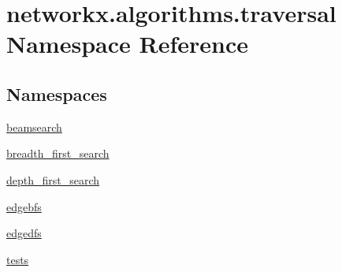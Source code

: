 \hypertarget{namespacenetworkx_1_1algorithms_1_1traversal}{}\section{networkx.\+algorithms.\+traversal Namespace Reference}
\label{namespacenetworkx_1_1algorithms_1_1traversal}
\subsection*{Namespaces}
\begin{DoxyCompactItemize}
\item 
 \hyperlink{namespacenetworkx_1_1algorithms_1_1traversal_1_1beamsearch}{beamsearch}
\item 
 \hyperlink{namespacenetworkx_1_1algorithms_1_1traversal_1_1breadth__first__search}{breadth\+\_\+first\+\_\+search}
\item 
 \hyperlink{namespacenetworkx_1_1algorithms_1_1traversal_1_1depth__first__search}{depth\+\_\+first\+\_\+search}
\item 
 \hyperlink{namespacenetworkx_1_1algorithms_1_1traversal_1_1edgebfs}{edgebfs}
\item 
 \hyperlink{namespacenetworkx_1_1algorithms_1_1traversal_1_1edgedfs}{edgedfs}
\item 
 \hyperlink{namespacenetworkx_1_1algorithms_1_1traversal_1_1tests}{tests}
\end{DoxyCompactItemize}
